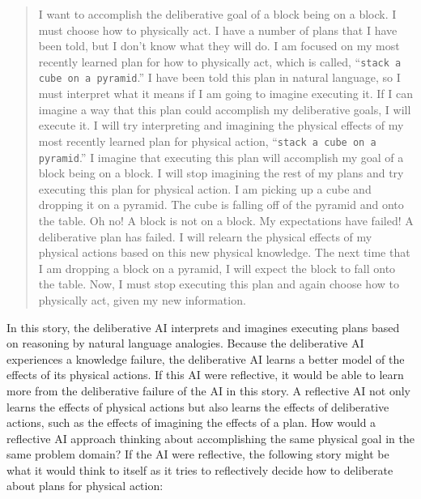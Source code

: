 \begin{quote}
  I want to accomplish the deliberative goal of a block being on a
  block.  I must choose how to physically act.  I have a number of
  plans that I have been told, but I don't know what they will do.  I
  am focused on my most recently learned plan for how to physically
  act, which is called, ``{\tt{stack a cube on a pyramid}}.''  I have
  been told this plan in natural language, so I must interpret what it
  means if I am going to imagine executing it.  If I can imagine a way
  that this plan could accomplish my deliberative goals, I will
  execute it.  I will try interpreting and imagining the physical
  effects of my most recently learned plan for physical action,
  ``{\tt{stack a cube on a pyramid}}.''  I imagine that executing this
  plan will accomplish my goal of a block being on a block.  I will
  stop imagining the rest of my plans and try executing this plan for
  physical action.  I am picking up a cube and dropping it on a
  pyramid.  The cube is falling off of the pyramid and onto the table.
  Oh no!  A block is not on a block.  My expectations have failed!  A
  deliberative plan has failed.  I will relearn the physical effects
  of my physical actions based on this new physical knowledge.  The
  next time that I am dropping a block on a pyramid, I will expect the
  block to fall onto the table.  Now, I must stop executing this plan
  and again choose how to physically act, given my new information.
\end{quote}
In this story, the deliberative AI interprets and imagines executing
plans based on reasoning by natural language analogies.  Because the
deliberative AI experiences a knowledge failure, the deliberative AI
learns a better model of the effects of its physical actions.  If this
AI were reflective, it would be able to learn more from the
deliberative failure of the AI in this story.  A reflective AI not
only learns the effects of physical actions but also learns the
effects of deliberative actions, such as the effects of imagining the
effects of a plan.  How would a reflective AI approach thinking about
accomplishing the same physical goal in the same problem domain?  If
the AI were reflective, the following story might be what it would
think to itself as it tries to reflectively decide how to deliberate
about plans for physical action:

